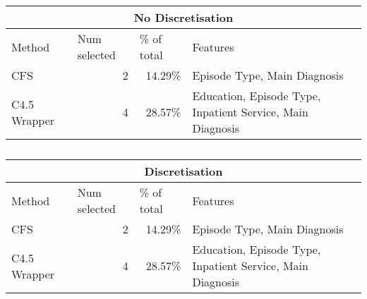 \begin{table}[h]
\caption{}
\begin{tabular}{|l|r|r|p{8.5cm}|}
\hline
\multicolumn{ 4}{|c|}{No Discretisation} \\ \hline
Method & \multicolumn{1}{l|}{Num selected} & \multicolumn{1}{l|}{\% of total} & Features \\ \hline
CFS & 2 & 14.29\% & Episode Type, Main Diagnosis \\ \hline
C4.5 Wrapper & 4 & 28.57\% & Education, Episode Type, Inpatient Service, Main Diagnosis \\ \hline
\end{tabular}
\vspace{1cm}
\vfill
\begin{tabular}{|l|r|r|p{8.5cm}|}
\hline
\multicolumn{ 4}{|c|}{Discretisation} \\ \hline
Method & \multicolumn{1}{l|}{Num selected} & \multicolumn{1}{l|}{\% of total} & Features \\ \hline
CFS & 2 & 14.29\% & Episode Type, Main Diagnosis \\ \hline
C4.5 Wrapper & 4 & 28.57\% & Education, Episode Type, Inpatient Service, Main Diagnosis \\ \hline
\end{tabular}
\end{table}
